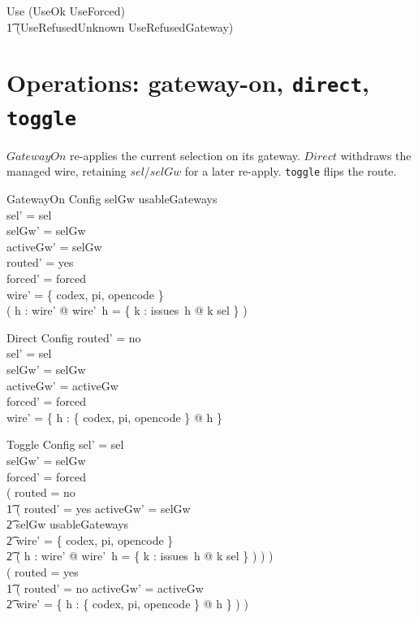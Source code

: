 \documentclass{article}
\begin{document}
\begin{zed}
  Use  (UseOk \lor UseForced) \lor \\
  \t1 (UseRefusedUnknown \lor UseRefusedGateway)
\end{zed}

\section{Operations: gateway-on, \texttt{direct}, \texttt{toggle}}

$GatewayOn$ re-applies the current selection on its gateway. $Direct$ withdraws
the managed wire, retaining $sel$/$selGw$ for a later re-apply. \texttt{toggle}
flips the route.

\begin{schema}{GatewayOn}
  \Delta Config
\where
  selGw \in usableGateways \\
  sel' = sel \\
  selGw' = selGw \\
  activeGw' = selGw \\
  routed' = yes \\
  forced' = forced \\
  \dom wire' = \{ codex, pi, opencode \} \\
  ( \forall h : \dom wire' @ wire'~h = \{ k : issues~h @ k \mapsto sel \} )
\end{schema}

\begin{schema}{Direct}
  \Delta Config
\where
  routed' = no \\
  sel' = sel \\
  selGw' = selGw \\
  activeGw' = activeGw \\
  forced' = forced \\
  wire' = \{ h : \{ codex, pi, opencode \} @ h \mapsto \emptyset \}
\end{schema}

\begin{schema}{Toggle}
  \Delta Config
\where
  sel' = sel \\
  selGw' = selGw \\
  forced' = forced \\
  ( routed = no \implies \\
  \t1 ( routed' = yes \land activeGw' = selGw \land \\
  \t2   selGw \in usableGateways \land \\
  \t2   \dom wire' = \{ codex, pi, opencode \} \land \\
  \t2   ( \forall h : \dom wire' @ wire'~h = \{ k : issues~h @ k \mapsto sel \} ) ) ) \\
  ( routed = yes \implies \\
  \t1 ( routed' = no \land activeGw' = activeGw \land \\
  \t2   wire' = \{ h : \{ codex, pi, opencode \} @ h \mapsto \emptyset \} ) )
\end{schema}
\end{document}
